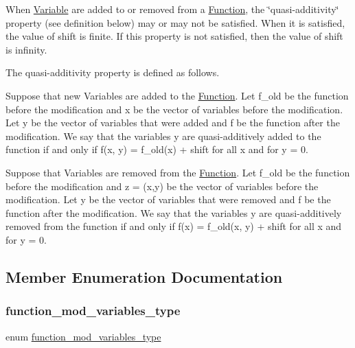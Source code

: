 When \mbox{\hyperlink{class_s_m_spp__di__unipi__it_1_1_variable}{Variable}} are added to or removed from a \mbox{\hyperlink{class_s_m_spp__di__unipi__it_1_1_function}{Function}}, the \char`\"{}quasi-\/additivity\char`\"{} property (see definition below) may or may not be satisfied. When it is satisfied, the value of shift is finite. If this property is not satisfied, then the value of shift is infinity.

The quasi-\/additivity property is defined as follows.

Suppose that new Variables are added to the \mbox{\hyperlink{class_s_m_spp__di__unipi__it_1_1_function}{Function}}. Let f\+\_\+old be the function before the modification and x be the vector of variables before the modification. Let y be the vector of variables that were added and f be the function after the modification. We say that the variables y are quasi-\/additively added to the function if and only if f(x, y) = f\+\_\+old(x) + shift for all x and for y = 0.

Suppose that Variables are removed from the \mbox{\hyperlink{class_s_m_spp__di__unipi__it_1_1_function}{Function}}. Let f\+\_\+old be the function before the modification and z = (x,y) be the vector of variables before the modification. Let y be the vector of variables that were removed and f be the function after the modification. We say that the variables y are quasi-\/additively removed from the function if and only if f(x) = f\+\_\+old(x, y) + shift for all x and for y = 0. 

\subsection{Member Enumeration Documentation}
\mbox{\label{class_s_m_spp__di__unipi__it_1_1_function_mod_vars_ac0f65f78b73646074224460e05478779}} 
\subsubsection{\texorpdfstring{function\+\_\+mod\+\_\+variables\+\_\+type}{function\_mod\_variables\_type}}
{\footnotesize\ttfamily enum \mbox{\hyperlink{class_s_m_spp__di__unipi__it_1_1_function_mod_vars_ac0f65f78b73646074224460e05478779}{function\+\_\+mod\+\_\+variables\+\_\+type}}}



